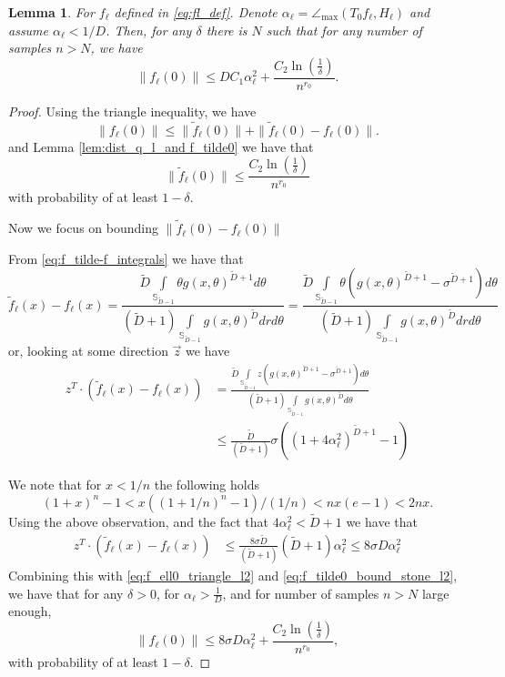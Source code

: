 \documentclass[12pt]{article}
\newtheorem{Lemma}[Theorem]{Lemma}
\theoremstyle{remark}
\newcommand{\wtilde}[1]{\widetilde{#1}}
\newcommand{\maxangle}{\angle_{\max}}
\begin{document}
\begin{appendices}
\begin{Lemma}\label{lem:dist_to_f_l0_srtong_small_alpha}
For $f_\ell$ defined in \eqref{eq:fl_def}. Denote 
$\alpha_\ell = \maxangle (T_0f_{\ell}, H_{\ell})$ and assume $\alpha_\ell<1/D$. Then,
for any $\delta$ there is $N$ such that for any number of samples $n > N$, we have 
\[
\| f_\ell(0)\| \leq D C_{1} \alpha_\ell ^2 + \frac{C_2\ln\left(\frac{1}{\delta}\right)}{n^{r_0}}.
\]
\end{Lemma}
\begin{proof}
Using the triangle inequality, we have 
\begin{equation}\label{eq:f_ell0_triangle_l2}
    \|f_\ell(0)\| \leq \| \wtilde{f}_\ell(0) \| + \| \wtilde{f}_\ell(0)  - f_\ell(0)\|.
\end{equation}
and Lemma \ref{lem:dist_q_l_and f_tilde0} we have that 
\begin{equation}\label{eq:f_tilde0_bound_stone_l2}
        \| \wtilde{f}_\ell(0)\| \leq \frac{C_2\ln\left(\frac{1}{\delta}\right)}{n^{r_0}}
\end{equation}
with probability of at least $1-\delta$.

Now we focus on bounding $\| \wtilde{f}_\ell(0)  - f_\ell(0)\|$

  From \eqref{eq:f_tilde-f_integrals} we have that 
\begin{equation*}
\wtilde{f}_\ell(x) - f_\ell(x)=
\frac{\wtilde D\int\limits_{\mathbb{S}_{\wtilde D-1}}\theta g(x,\theta)^{\wtilde D+1} d\theta}{(\wtilde D+1)\int\limits_{\mathbb{S}_{\wtilde D-1}}g(x,\theta)^{\wtilde D} drd\theta}     
=
\frac{\wtilde D\int\limits_{\mathbb{S}_{\wtilde D-1}}\theta (g(x,\theta)^{\wtilde D+1} - \sigma^{\wtilde D+1}) d\theta}{(\wtilde D+1)\int\limits_{\mathbb{S}_{\wtilde D-1}}g(x,\theta)^{\wtilde D} drd\theta}     
\end{equation*}
or, looking at some direction $\vec{z}$ we have 
\begin{align*}
z^T\cdot (\wtilde{f}_\ell(x) - f_\ell(x))&=
\frac{\wtilde D\int\limits_{\mathbb{S}_{\wtilde D-1}}z (g(x,\theta)^{\wtilde D+1}- \sigma^{\wtilde D+1}) d\theta}{(\wtilde D+1)\int\limits_{\mathbb{S}_{\wtilde D-1}}g(x,\theta)^{\wtilde D} d\theta} 
\\
&\leq
\frac{\wtilde D}{(\wtilde D+1)}\sigma((1+4\alpha_\ell^2)^{\wtilde D+1} - 1)
\end{align*}

We note that for $x<1/n$ the following holds
\[
(1+x)^n-1<x((1+1/n)^n-1)/(1/n)<nx(e-1)<2nx.
\]
Using the above observation, and the fact that $4\alpha_\ell^2 <\wtilde D+1$ we have that 
\begin{align*}
z^T\cdot (\wtilde{f}_\ell(x) - f_\ell(x))&\leq
\frac{8\sigma\wtilde D}{(\wtilde D+1)}(\wtilde D+1)\alpha_\ell^2 \leq 8\sigma D \alpha_\ell^2
\end{align*}
Combining this with  \eqref{eq:f_ell0_triangle_l2} and \eqref{eq:f_tilde0_bound_stone_l2}, we have that for any $\delta>0$, for $\alpha_\ell >\frac{1}{D}$, and for number of samples $n>N$ large enough, 
\[
\|f_\ell(0)\| \leq 8\sigma D \alpha_\ell^2 + \frac{C_2\ln\left(\frac{1}{\delta}\right)}{n^{r_0}},
\]
with probability of at least $1-\delta$.
\end{proof}


\end{appendices}
\end{document}
